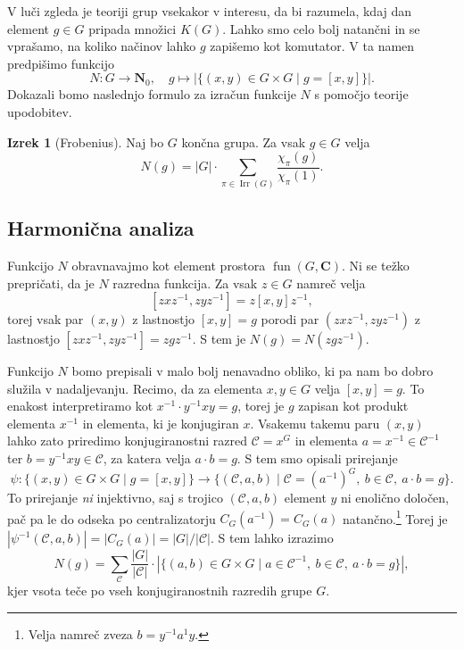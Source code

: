 \documentclass[11pt]{book}
\def\NN{\mathbf{N}}
\def\CC{\mathbf{C}}
\def\conclass{\mathcal{C}}
\DeclareMathOperator\Irr{Irr}
\DeclareMathOperator\fun{fun}
\theoremstyle{definition}
\theoremstyle{zgled}
\theoremstyle{odprtproblem}
\theoremstyle{domacanaloga}
\theoremstyle{izrek}
\newtheorem*{izrek}{Izrek}
\begin{document}
V luči zgleda je teoriji grup vsekakor v interesu, da bi razumela, kdaj dan element $g \in G$ pripada množici $K(G)$. Lahko smo celo bolj natančni in se vprašamo, na koliko načinov lahko $g$ zapišemo kot komutator. V ta namen predpišimo funkcijo
\[
    N \colon G \to \NN_0, \quad
    g \mapsto |\{ (x,y) \in G \times G \mid g = [x,y] \}|.
\]
Dokazali bomo naslednjo formulo za izračun funkcije $N$ s pomočjo teorije upodobitev.

\begin{izrek}[Frobenius]
Naj bo $G$ končna grupa. Za vsak $g \in G$ velja
\[
    N(g) = |G| \cdot \sum_{\pi \in \Irr(G)} \frac{\chi_{\pi}(g)}{\chi_{\pi}(1)}.
\]
\end{izrek}


\subsection{Harmonična analiza}

Funkcijo $N$ obravnavajmo kot element prostora $\fun(G,\CC)$. Ni se težko prepričati, da je $N$ razredna funkcija. Za vsak $z \in G$ namreč velja
\[
    [z x z^{-1}, z y z^{-1}] = z [x,y] z^{-1},
\]
torej vsak par $(x,y)$ z lastnostjo $[x,y] = g$ porodi par $(z x z^{-1}, z y z^{-1})$ z lastnostjo $[z x z^{-1}, z y z^{-1}] = z g z^{-1}$. S tem je $N(g) = N(z g z^{-1})$.

Funkcijo $N$ bomo prepisali v malo bolj nenavadno obliko, ki pa nam bo dobro služila v nadaljevanju. Recimo, da za elementa $x,y \in G$ velja $[x,y] = g$. To enakost interpretiramo kot $x^{-1} \cdot y^{-1} x y = g$, torej je $g$ zapisan kot produkt elementa $x^{-1}$ in elementa, ki je konjugiran $x$. Vsakemu takemu paru $(x,y)$ lahko zato priredimo konjugiranostni razred $\conclass = x^G$ in elementa $a = x^{-1} \in \conclass^{-1}$ ter $b = y^{-1} x y \in \conclass$, za katera velja $a \cdot b = g$. S tem smo opisali prirejanje
\[
    \psi \colon \{ (x,y) \in G \times G \mid g = [x,y] \} \to 
    \{ (\conclass, a, b) \mid \conclass = (a^{-1})^G, \ b \in \conclass,\ a \cdot b = g \}.
\]
To prirejanje \emph{ni} injektivno, saj s trojico $(\conclass,a,b)$ element $y$ ni enolično določen, pač pa le do odseka po centralizatorju $C_G(a^{-1}) = C_G(a)$ natančno.\footnote{Velja namreč zveza $b = y^{-1} a^{1} y$.} Torej je $|\psi^{-1}(\conclass,a,b)| = |C_G(a)| = |G|/|\conclass|$. S tem lahko izrazimo
\[
    N(g) = \sum_{\conclass} \frac{|G|}{|\conclass|} \cdot |\{ (a,b) \in G \times G \mid a \in \conclass^{-1}, \ b \in \conclass, \ a \cdot b = g \}|,
\]
kjer vsota teče po vseh konjugiranostnih razredih grupe $G$. 
\end{document}
